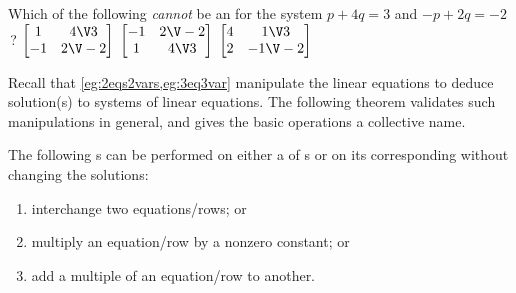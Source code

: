 \begin{activity}
Which of the following \emph{cannot} be an  for the system \(p+4q=3\) and \(-p+2q=-2\)\,?
{\(\begin{bmatrix} 1&4\V3\\-1&2\V-2 \end{bmatrix}\)}
{\(\begin{bmatrix} -1&2\V-2\\1&4\V3 \end{bmatrix}\)}
{\(\begin{bmatrix} 4&1\V3\\2&-1\V-2 \end{bmatrix}\)}
\end{activity}





Recall that \cref{eg:2eqs2vars,eg:3eq3var} manipulate the linear equations to deduce solution(s) to systems of linear equations.
The following theorem validates such manipulations in general, and gives the basic operations a collective name. 


\begin{theorem} \label{thm:erowop} 
The following s can be performed on either a  of s or on its corresponding  without changing the solutions:
\begin{enumerate}
\item {}interchange two equations\slash rows; or
\item multiply an equation\slash row by a nonzero constant; or
\item add a multiple of an equation\slash row to another.
\end{enumerate}
\end{theorem}

\begin{comment}
Interestingly, some other texts omit a proof that row operations preserve the solution(s).  Poole comments on reversibility.  Larson comments that row operations produce `equivalent' systems, but does not prove.  Beezer proves it.
\end{comment}

